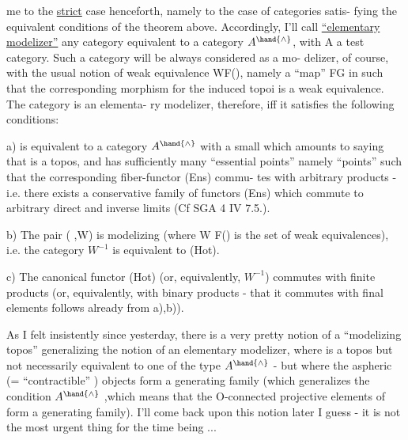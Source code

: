 me to the \uline{strict} case henceforth,  namely to the case of categories satis-%
fying the equivalent conditions of the theorem above. Accordingly, I'll
call \uline{``elementary modelizer''} any category  equivalent to a category $A^{\hand{\wedge}}$,
with A a test category.  Such a category will be always considered as a mo-%
delizer, of course,  with the usual notion of weak equivalence W\hand{$\subset$}F(),
namely a ``map''  F\hand{$\to$}G in  such that the corresponding morphism for the
induced topoi is a weak equivalence.  The  category  is an elementa-%
ry modelizer,  therefore,  iff it satisfies the following conditions:

a)  is equivalent to a category $A^{\hand{\wedge}}$ with a small  which amounts to
saying that  is a topos,  and has sufficiently many ``essential points''
namely ``points'' such that the corresponding fiber-functor  (Ens) commu-%
tes with arbitrary products  -  i.e. there exists a conservative family
of functors   (Ens)  which commute to arbitrary direct and inverse
limits (Cf SGA 4 IV 7.5.).

b)  The pair ( ,W) is modelizing (where W \hand{$\subset$} F() is the set of weak
equivalences),  i.e. the category  $W^{-1}$  is equivalent to (Hot).

c)  The canonical functor  (Hot)  (or, equivalently,  $W^{-1}$)
commutes with finite products (or, equivalently,  with binary products -
that it commutes with final elements follows already from a),b)).

As I felt insistently since yesterday,  there is a very pretty notion
of a ``modelizing topos'' generalizing the notion of an elementary modelizer,
where  is a topos but not necessarily equivalent to one of the type $A^{\hand{\wedge}}$
-  but  where  the aspheric (= ``contractible'' ) objects form a
generating family (which generalizes the condition $A^{\hand{\wedge}}$ ,which means
that the O-connected projective elements of  form a generating family).
I'll come back upon this notion later I guess -  it is not the most urgent
thing for the time being ...

